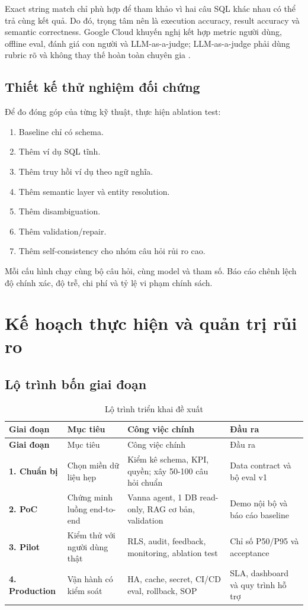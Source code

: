 \documentclass[12pt,a4paper]{article}
\begin{document}
Exact string match chỉ phù hợp để tham khảo vì hai câu SQL khác nhau có thể
trả cùng kết quả. Do đó, trọng tâm nên là execution accuracy, result accuracy
và semantic correctness. Google Cloud khuyến nghị kết hợp metric người dùng,
offline eval, đánh giá con người và LLM-as-a-judge; LLM-as-a-judge phải dùng
rubric rõ và không thay thế hoàn toàn chuyên gia \cite{google2025}.

\subsection{Thiết kế thử nghiệm đối chứng}

Để đo đóng góp của từng kỹ thuật, thực hiện ablation test:

\begin{enumerate}
  \item Baseline chỉ có schema.
  \item Thêm ví dụ SQL tĩnh.
  \item Thêm truy hồi ví dụ theo ngữ nghĩa.
  \item Thêm semantic layer và entity resolution.
  \item Thêm disambiguation.
  \item Thêm validation/repair.
  \item Thêm self-consistency cho nhóm câu hỏi rủi ro cao.
\end{enumerate}

Mỗi cấu hình chạy cùng bộ câu hỏi, cùng model và tham số. Báo cáo chênh lệch
độ chính xác, độ trễ, chi phí và tỷ lệ vi phạm chính sách.

\section{Kế hoạch thực hiện và quản trị rủi ro}

\subsection{Lộ trình bốn giai đoạn}

\begin{longtable}{>{\bfseries}p{2.2cm}p{4.0cm}p{5.1cm}p{3.2cm}}
\caption{Lộ trình triển khai đề xuất}\\
\toprule
Giai đoạn & Mục tiêu & Công việc chính & Đầu ra\\
\midrule
\endfirsthead
\toprule
Giai đoạn & Mục tiêu & Công việc chính & Đầu ra\\
\midrule
\endhead
1. Chuẩn bị & Chọn miền dữ liệu hẹp &
Kiểm kê schema, KPI, quyền; xây 50-100 câu hỏi chuẩn &
Data contract và bộ eval v1\\
2. PoC & Chứng minh luồng end-to-end &
Vanna agent, 1 DB read-only, RAG cơ bản, validation &
Demo nội bộ và báo cáo baseline\\
3. Pilot & Kiểm thử với người dùng thật &
RLS, audit, feedback, monitoring, ablation test &
Chỉ số P50/P95 và acceptance\\
4. Production & Vận hành có kiểm soát &
HA, cache, secret, CI/CD eval, rollback, SOP &
SLA, dashboard và quy trình hỗ trợ\\
\bottomrule
\end{longtable}
\end{document}
